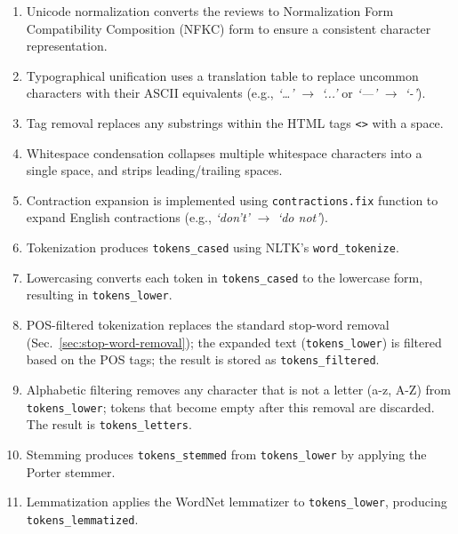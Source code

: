 \documentclass[a4paper,fleqn]{cas-dc}
\newcommand{\code}[1]{\texttt{#1}}
\newcommand{\literal}[1]{\textit{`#1'}}
\begin{document}
\begin{enumerate}
	\item {Unicode normalization} converts the reviews to Normalization Form Compatibility Composition (NFKC) form to ensure a consistent character representation.
	
	\item {Typographical unification} uses a translation table to replace uncommon characters with their ASCII equivalents (e.g., \literal{\ldots} $\rightarrow$ \literal{...} or \literal{---} $\rightarrow$ \literal{-}).
	
   \item {Tag removal} replaces any substrings within the HTML tags \code{<>} with a space.
	
	\item {Whitespace condensation} collapses multiple whitespace characters into a single space, and strips leading/trailing spaces.
	
	\item {Contraction expansion} is implemented using \code{con\-tra\-ctions.fix} function to expand English contractions (e.g., \literal{don't} $\rightarrow$ \literal{do not}).
	
	\item {Tokenization} produces \code{tokens\_cased} using NLTK's \code{word\_tokenize}.
	
	\item {Lowercasing} converts each token in \code{tokens\_cased} to the lowercase form, resulting in \code{tokens\_lower}.
	
	\item {POS-filtered tokenization} replaces the standard stop-word removal (Sec.~\ref{sec:stop-word-removal}); the expanded text (\code{tokens\_\-lower}) is filtered based on the POS tags; the result is stored as \code{tokens\_filtered}.
	
	\item {Alphabetic filtering} removes any character that is not a letter (a-z, A-Z) from \code{tokens\_lower}; tokens that become empty after this removal are discarded. The result is \code{tokens\_letters}.
	
	\item {Stemming} produces \code{tokens\_stemmed} from \code{tokens\_lower} by applying the Porter stemmer.
	
	\item {Lemmatization} applies the WordNet lemmatizer to \code{tokens\_lower}, producing \code{tokens\_lemmatized}.
\end{enumerate}
\end{document}
